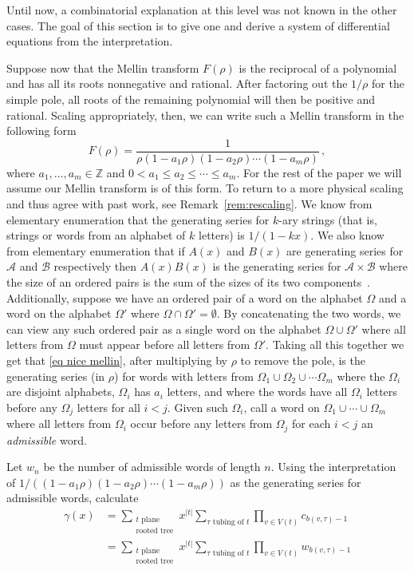 \documentclass[oneside]{amsart}
\theoremstyle{definition}
\begin{document}
Until now, a combinatorial explanation at this level was not known in the other cases.  The goal of this section is to give one and derive a system of differential equations from the interpretation.

Suppose now that the Mellin transform $F(\rho)$ is the reciprocal of a polynomial and has all its roots nonnegative and rational.  After factoring out the $1/\rho$ for the simple pole, all roots of the remaining polynomial will then be positive and rational.  Scaling appropriately, then, we can write such a Mellin transform in the following form 
%
\begin{equation}\label{eq nice mellin}
  F(\rho) = \frac{1}{\rho(1-a_1\rho)(1-a_2\rho)\cdots (1-a_m\rho)}\,,
\end{equation}
where $a_1, \ldots, a_m \in \mathbb{Z}$ and $0<a_1\leq a_2\leq \cdots \leq a_m$.  For the rest of the paper we will assume our Mellin transform is of this form. To return to a more physical scaling and thus agree with past work, see Remark~\ref{rem:rescaling}.  We know from elementary enumeration that the generating series for $k$-ary strings (that is, strings or words from an alphabet of $k$ letters) is $1/(1-kx)$.  We also know from elementary enumeration that if $A(x)$ and $B(x)$ are generating series for $\mathcal{A}$ and $\mathcal{B}$ respectively then $A(x)B(x)$ is the generating series for $\mathcal{A}\times \mathcal{B}$ where the size of an ordered pairs is the sum of the sizes of its two components~\cite[Part.~A]{FS}.  %
Additionally, suppose we have an ordered pair of a word on the alphabet $\Omega$ and a word on the alphabet $\Omega'$ where $\Omega\cap \Omega'=\emptyset$.  By concatenating the two words, we can view any such ordered pair as a single word on the alphabet $\Omega\cup \Omega'$ where all letters from $\Omega$ must appear before all letters from $\Omega'$.
Taking all this together we get that \eqref{eq nice mellin}, after multiplying by $\rho$ to remove the pole, 
is the generating series (in $\rho$) for words with letters from $\Omega_1\cup \Omega_2\cup\cdots \Omega_m$ where the $\Omega_i$ are disjoint alphabets, $\Omega_i$ has $a_i$ letters, and where the words have all $\Omega_i$ letters before any $\Omega_j$ letters for all $i<j$.  Given such $\Omega_i$, call a word on $\Omega_1\cup \cdots \cup \Omega_m$ where all letters from $\Omega_i$ occur before any letters from $\Omega_j$ for each $i<j$ an \emph{admissible} word.

Let $w_n$ be the number of admissible words of length $n$.
Using the interpretation of  $1/((1-a_1\rho)(1-a_2\rho)\cdots (1-a_m\rho))$ as the generating series for admissible words, calculate
\begin{align*} \gamma(x) & = \sum_{\substack{t \text{ plane }\\\text{rooted tree}}} x^{|t|} \sum_{\tau \text{ tubing of }t} \prod_{v\in V(t)} c_{b(v,\tau)-1} \\
 & = \sum_{\substack{t \text{ plane }\\\text{rooted tree}}} x^{|t|} \sum_{\tau \text{ tubing of }t} \prod_{v\in V(t)} w_{b(v,\tau)-1} \end{align*}
\end{document}
